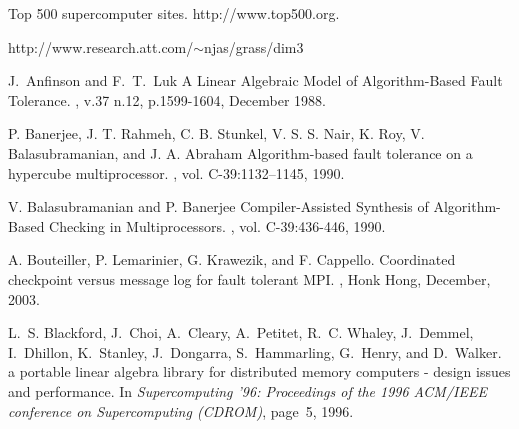 \documentclass{sig-alternate}
\begin{document}
\begin{thebibliography}{14}








Top 500 supercomputer sites. http://www.top500.org.

http://www.research.att.com/$\sim$njas/grass/dim3

J.~Anfinson and F.~T.~Luk
\newblock A Linear Algebraic Model of Algorithm-Based Fault Tolerance.
, v.37 n.12, p.1599-1604, December 1988.

P. Banerjee, J. T. Rahmeh, C. B. Stunkel, V. S. S. Nair, K. Roy, V. Balasubramanian, and J. A. Abraham
\newblock Algorithm-based fault tolerance on a hypercube multiprocessor.
, vol. C-39:1132--1145, 1990.

V. Balasubramanian and P. Banerjee
\newblock Compiler-Assisted Synthesis of Algorithm-Based Checking in Multiprocessors.
, vol. C-39:436-446, 1990.

A. Bouteiller, P. Lemarinier, G. Krawezik, and F. Cappello.
\newblock Coordinated checkpoint versus message log for fault tolerant MPI.
, 
Honk Hong, December, 2003.

L.~S. Blackford, J.~Choi, A.~Cleary, A.~Petitet, R.~C. Whaley, J.~Demmel,
  I.~Dhillon, K.~Stanley, J.~Dongarra, S.~Hammarling, G.~Henry, and D.~Walker.
 a portable linear algebra library for distributed memory
  computers - design issues and performance.
\newblock In {\em Supercomputing '96: Proceedings of the 1996 ACM/IEEE
  conference on Supercomputing (CDROM)}, page~5, 1996.



\end{thebibliography}
\end{document}
